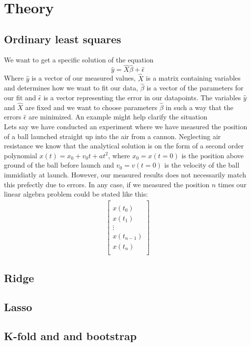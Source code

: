 \section{Theory}
\subsection{Ordinary least squares}
We want to get a specific solution of the equation
\[ \hat{y} = \hat{X}\hat{\beta}+\hat{\epsilon} \]
Where $\hat{y}$ is a vector of our measured values, $\hat{X}$ is a matrix containing variables and determines how we want to fit our data, $\hat{\beta}$ is a vector of the parameters for our fit and $\hat{\epsilon}$ is a vector representing the error in our datapoints. The variables $\hat{y}$ and $\hat{X}$ are fixed and we want to choose parameters $\hat{\beta}$ in such a way that the errors $\hat{\epsilon}$ are minimized. An example might help clarify the situation\\
Lets say we have conducted an experiment where we have measured the position of a ball launched straight up into the air from a cannon. Neglecting air resistance we know that the analytical solution is on the form of a second order polynomial $x(t)=x_0+v_0t+at^2$, where $x_0 = x(t=0)$ is the position above ground of the ball before launch and $v_0=v(t=0)$ is the velocity of the ball immidiatly at launch. However, our measured results does not necessarily match this prefectly due to errors. In any case, if we measured the position $n$ times our linear algebra problem could be stated like this:
\begin{align*}
	\begin{bmatrix}
		\\ x(t_0) \\ x(t_1) \\ \vdots \\ x(t_{n-1}) \\ x(t_n)\\
	\end{bmatrix}
\end{align*}
\subsection{Ridge}
\subsection{Lasso}
\subsection{K-fold and and bootstrap}